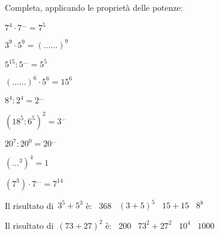 \begin{esercizio}
\label{ese:1.13}
 Completa, applicando le proprietà delle potenze:
\begin{multicols}{3}
 \begin{enumeratea}
 \item \(7^4\cdot7^{\ldots}=7^5\)
 \item \(3^9\cdot5^9=(\ldots\ldots)^9\)
 \item \(5^{15}:5^{\ldots}=5^5\)
 \item \((\ldots\ldots)^6\cdot5^6=15^6\)
 \item \(8^4:2^4=2^{\ldots}\)
 \item \((18^5:6^5)^2=3^{\ldots}\)
 \item \(20^7:20^0=20^{\ldots}\)
 \item \((\ldots^3)^4=1\)
 \item \((7^3) \cdot 7^{\dots}=7^{14}\)
 \end{enumeratea}
\end{multicols}
\end{esercizio}

\begin{esercizio}
\label{ese:1.14}
 Il risultato di~\(3^5+5^3\) è: \quad \quad \quad \quad
 \boxA\enspace~368 \quad \boxB\enspace~\((3+5)^5\) \quad \boxC\enspace~\(15+15\) \quad \boxD\enspace~\(8^8\)
 \end{esercizio}

\begin{esercizio}
\label{ese:1.15}
 Il risultato di~\((73+27)^2\) è: \quad \quad
 \boxA\enspace~200 \quad\boxB\enspace~\(73^2+27^2\) \quad\boxC\enspace~\(10^4\) \quad\boxD\enspace~\(1000\)
\end{esercizio}


\subsubsection*{}


